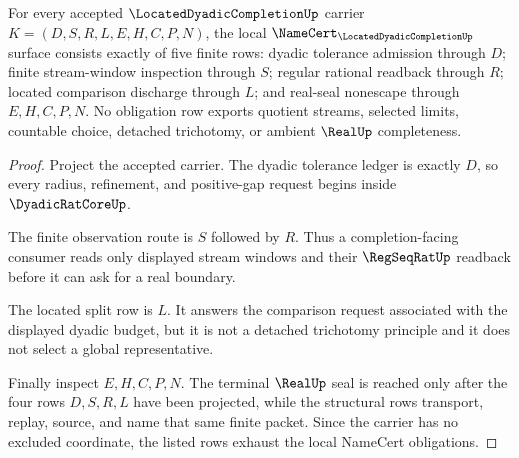 \begin{theorem}
\label{thm:located-dyadic-completion-namecert-obligations}
For every accepted $\LocatedDyadicCompletionUp$ carrier $K=(D,S,R,L,E,H,C,P,N)$, the local $\NameCert_{\LocatedDyadicCompletionUp}$ surface consists exactly of five finite rows: dyadic tolerance admission through $D$; finite stream-window inspection through $S$; regular rational readback through $R$; located comparison discharge through $L$; and real-seal nonescape through $E,H,C,P,N$. No obligation row exports quotient streams, selected limits, countable choice, detached trichotomy, or ambient $\RealUp$ completeness.
\end{theorem}
\begin{proof}
Project the accepted carrier. The dyadic tolerance ledger is exactly $D$, so every radius, refinement, and positive-gap request begins inside $\DyadicRatCoreUp$.

The finite observation route is $S$ followed by $R$. Thus a completion-facing consumer reads only displayed stream windows and their $\RegSeqRatUp$ readback before it can ask for a real boundary.

The located split row is $L$. It answers the comparison request associated with the displayed dyadic budget, but it is not a detached trichotomy principle and it does not select a global representative.

Finally inspect $E,H,C,P,N$. The terminal $\RealUp$ seal is reached only after the four rows $D,S,R,L$ have been projected, while the structural rows transport, replay, source, and name that same finite packet. Since the carrier has no excluded coordinate, the listed rows exhaust the local NameCert obligations.
\end{proof}

